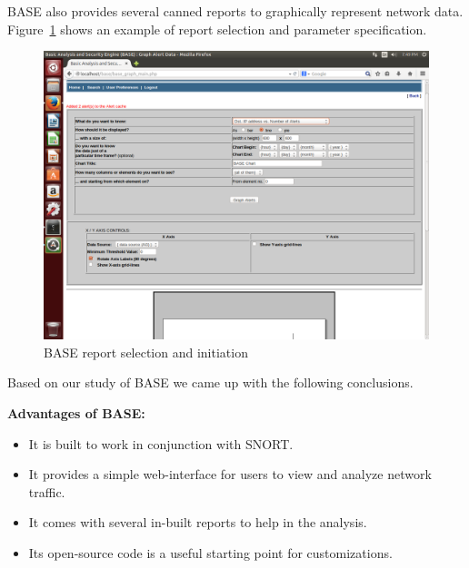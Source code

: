 BASE also provides several canned reports to graphically represent
network data. Figure~\ref{fig:r4} shows an example of report selection and
parameter specification.

\begin{figure}[!tb]
    \centering
    \includegraphics[width=2\columnwidth]{figures/R4_BASE_Report}
    \caption{BASE report selection and initiation}
    \label{fig:r4}
\end{figure}

Based on our study of BASE we came up with the following conclusions.

\textbf{Advantages of BASE:}
\begin{itemize}

\item It is built to work in conjunction with SNORT.

\item It provides a simple web-interface for users to view and
  analyze network traffic.

\item It comes with several in-built reports to help in the analysis.

\item Its open-source code is a useful starting point for customizations.

\end{itemize}

